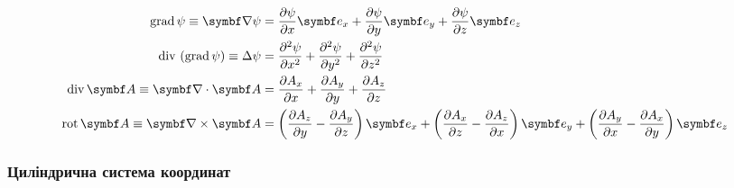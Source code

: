 \begin{align}\label{cartesian}
	\mathrm{grad}\,\psi \equiv \vect{\nabla}\psi & = \frac{\partial \psi}{\partial x} \vect{e}_x + \frac{\partial \psi}{\partial y} \vect{e}_y +
	\frac{\partial \psi}{\partial z} \vect{e}_z \\
	\mathrm{div}\,\left(\mathrm{grad}\,\psi\right) \equiv \Laplasian\psi    & = \frac{\partial^2 \psi}{\partial x^2} + \frac{\partial^2 \psi}{\partial y^2} + \frac{\partial^2 \psi }{\partial z^2}               \\
	\mathrm{div}\,\vect{A} \equiv \divg\vect{A}     & = \frac{\partial A_x}{\partial x}  + \frac{\partial A_y}{\partial y} + \frac{\partial A_z}{\partial z}                              \\
	\mathrm{rot}\,\vect{A} \equiv  \rot\vect{A}      & = \left( \frac{\partial A_z}{\partial y}  - \frac{\partial A_y}{\partial z}\right)  \vect{e}_x +
	\left( \frac{\partial A_x}{\partial z}  - \frac{\partial A_z}{\partial x}\right)  \vect{e}_y +
	\left( \frac{\partial A_y}{\partial x}  - \frac{\partial A_x}{\partial y}\right)  \vect{e}_z
\end{align}

\subsubsection{Циліндрична система координат}

